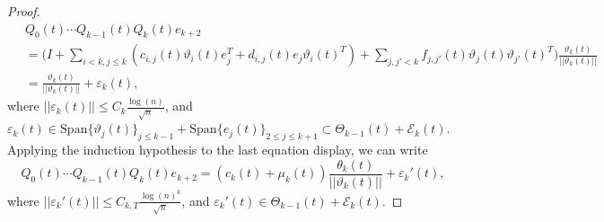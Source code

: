 \documentclass{amsart}
\numberwithin{equation}{section}
\begin{document}
\begin{proof}
\begin{equation*}
    \begin{split}
        ~&Q_0(t)\cdots Q_{k-1}(t)Q_k(t)e_{k+2}\\
        &= \bigg(I+\sum_{i <k, j \leq k} (c_{i,j}(t) \vartheta_i(t)e_j^T+d_{i,j}(t) e_j\vartheta_i(t)^T)+\sum_{j,j' < k } f_{j,j'}(t) \vartheta_j(t)\vartheta_{j'}(t)^T\bigg) \frac{\vartheta_k(t)}{||\vartheta_k(t)||}\\
            & = \frac{\vartheta_k(t)}{||\vartheta_k(t)||}+\varepsilon_k(t),
    \end{split}
\end{equation*}
where $||\varepsilon_k(t)||\leq C_k\frac{\log(n)}{\sqrt{n}}$, and $\varepsilon_k(t) \in \mathrm{Span}\{\vartheta_j(t)\}_{j\leq k-1}+\mathrm{Span}\{e_j(t)\}_{2\leq j\leq k+1} \subset \Theta_{k-1}(t)+\mathcal{E}_{k}(t)$. Applying the induction hypothesis to the last equation display, we can write
\begin{equation*}
    Q_0(t)\cdots Q_{k-1}(t)Q_k(t)e_{k+2}  =\left(c_k(t)+\mu_k(t)\right)\frac{\theta_k(t)}{||\vartheta_{k}(t)||}+\varepsilon_k'(t),
\end{equation*}
where $||\varepsilon_k'(t)||\leq C_{k,T}\frac{\log(n)^k}{\sqrt{n}}$, and $\varepsilon_k'(t) \in \Theta_{k-1}(t)+\mathcal{E}_{k}(t)$. 


\end{proof}
\end{document}
